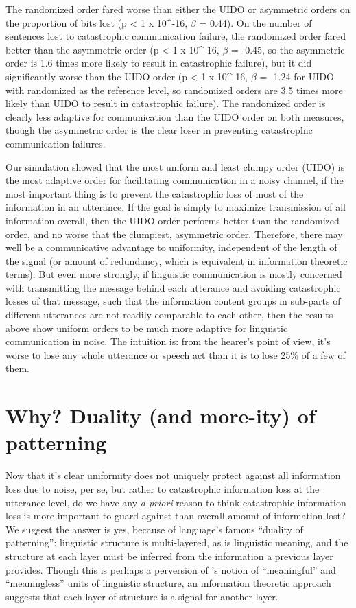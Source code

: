 \documentclass[12pt]{article}
\begin{document}
The randomized order fared worse than either the UIDO or asymmetric orders on the proportion of bits lost (p < 1 x 10^{-16}, $\beta$ = 0.44). On the number of sentences lost to catastrophic communication failure, the randomized order fared better than the asymmetric order (p < 1 x 10^{-16}, $\beta$ = -0.45, so the asymmetric order is 1.6 times more likely to result in catastrophic failure), but it did significantly worse than the UIDO order (p < 1 x 10^{-16}, $\beta$ = -1.24 for UIDO with randomized as the reference level, so randomized orders are 3.5 times more likely than UIDO to result in catastrophic failure). The randomized order is clearly less adaptive for communication than the UIDO order on both measures, though the asymmetric order is the clear loser in preventing catastrophic communication failures.

Our simulation showed that the most uniform and least clumpy order (UIDO) is the most adaptive order for facilitating communication in a noisy channel, if the most important thing is to prevent the catastrophic loss of most of the information in an utterance. If the goal is simply to maximize transmission of all information overall, then the UIDO order performs better than the randomized order, and no worse that the clumpiest, asymmetric order. Therefore, there may well be a communicative advantage to uniformity, independent of the length of the signal (or amount of redundancy, which is equivalent in information theoretic terms). But even more strongly, if linguistic communication is mostly concerned with transmitting the message behind each utterance and avoiding catastrophic losses of that message, such that the information content groups in sub-parts of different utterances are not readily comparable to each other, then the results above show uniform orders to be much more adaptive for linguistic communication in noise. The intuition is: from the hearer's point of view, it's worse to lose any whole utterance or speech act than it is to lose 25\% of a few of them.


\section{Why? Duality (and more-ity) of patterning}
\label{moreity}

Now that it's clear uniformity does not uniquely protect against all information loss due to noise, per se, but rather to catastrophic information loss at the utterance level, do we have any \textsl{a priori} reason to think catastrophic information loss is more important to guard against than overall amount of information lost? We suggest the answer is yes, because of language's famous ``duality of patterning'': linguistic structure is multi-layered, as is linguistic meaning, and the structure at each layer must be inferred from the information a previous layer provides. Though this is perhaps a perversion of \citet{hockett1958}'s notion of ``meaningful'' and ``meaningless'' units of linguistic structure, an information theoretic approach suggests that each layer of structure is a signal for another layer.
\end{document}
